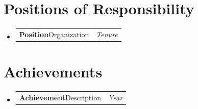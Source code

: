 \documentclass[a4paper,11pt]{article}
\makeatletter
\newcommand{\resumePOR}[3]{
\vspace{0.5mm}\item
    \begin{tabular*}{0.97\textwidth}[t]{l@{\extracolsep{\fill}}r}
        \textbf{#1}\hspace{0.3mm}#2 & \textit{\small{#3}} 
    \end{tabular*}
}
\newcommand{\resumeSubHeadingListStart}{\begin{itemize}[leftmargin=*,labelsep=0mm]}
\newcommand{\resumeSubHeadingListEnd}{\end{itemize}\vspace{2mm}}
\makeatother
\begin{document}
\section{Positions of Responsibility}
\resumeSubHeadingListStart
\resumePOR{Position} %
    {Organization} %
    {Tenure} %
\resumeSubHeadingListEnd

\section{Achievements}
\resumeSubHeadingListStart
\resumePOR{Achievement}
    {Description}
    {Year}
\resumeSubHeadingListEnd
\end{document}
